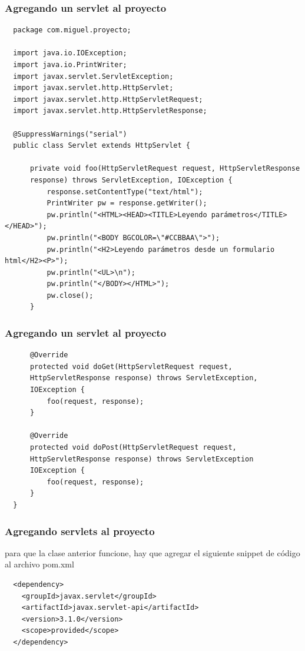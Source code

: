 \documentclass{beamer}
\begin{document}
\begin{frame}[fragile]
  \frametitle{Agregando un servlet al proyecto}
  \begin{verbatim}
  package com.miguel.proyecto;

  import java.io.IOException;
  import java.io.PrintWriter;
  import javax.servlet.ServletException;
  import javax.servlet.http.HttpServlet;
  import javax.servlet.http.HttpServletRequest;
  import javax.servlet.http.HttpServletResponse;

  @SuppressWarnings("serial")
  public class Servlet extends HttpServlet {

      private void foo(HttpServletRequest request, HttpServletResponse
      response) throws ServletException, IOException {
          response.setContentType("text/html");
          PrintWriter pw = response.getWriter();
          pw.println("<HTML><HEAD><TITLE>Leyendo parámetros</TITLE></HEAD>");
          pw.println("<BODY BGCOLOR=\"#CCBBAA\">");
          pw.println("<H2>Leyendo parámetros desde un formulario html</H2><P>");
          pw.println("<UL>\n");
          pw.println("</BODY></HTML>");
          pw.close();
      }
  \end{verbatim}

\end{frame}

\begin{frame}[fragile]
  \frametitle{Agregando un servlet al proyecto}
  \begin{verbatim}
      @Override
      protected void doGet(HttpServletRequest request,
      HttpServletResponse response) throws ServletException,
      IOException {
          foo(request, response);
      }

      @Override
      protected void doPost(HttpServletRequest request,
      HttpServletResponse response) throws ServletException
      IOException {
          foo(request, response);
      }
  }
  \end{verbatim}
\end{frame}

\begin{frame}[fragile]
  \frametitle{Agregando servlets al proyecto}
  para que la clase anterior funcione, hay que agregar el siguiente snippet de
código al archivo pom.xml

\begin{verbatim}
  <dependency>
    <groupId>javax.servlet</groupId>
    <artifactId>javax.servlet-api</artifactId>
    <version>3.1.0</version>
    <scope>provided</scope>
  </dependency>
\end{verbatim}

\end{frame}
\end{document}
